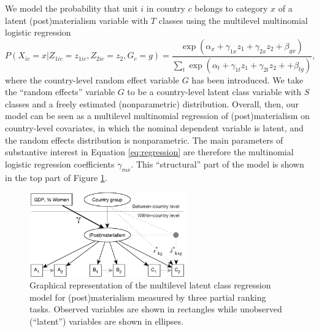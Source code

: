 \documentclass[letterpaper,12pt]{article}
\begin{document}
We  model the probability that unit $i$ in country $c$ belongs to category $x$ of a latent (post)materialism variable with $T$ classes using the multilevel multinomial logistic regression
\begin{equation}
P(X_{ic} = x| Z_{1ic} = z_{1ic}, Z_{2ic} = z_2, G_c = g) = \frac{\exp(\alpha_x + \gamma_{1x} z_1 +\gamma_{2x} z_2  + \beta_{gx})}
					{\sum_t \exp(\alpha_t + \gamma_{1t} z_1 +  \gamma_{2t} z_2 +  + \beta_{tg})},
					\label{eq:regression}
\end{equation}
where the country-level random effect variable $G$ has been introduced. We take the ``random effects'' variable $G$ to be a country-level latent class variable with $S$ classes and a freely estimated (nonparametric) distribution. Overall, then, our model can be seen as a multilevel multinomial regression of (post)materialism on country-level covariates, in which the nominal dependent variable is latent, and the random effects distribution is nonparametric. The main parameters of substantive interest in Equation \ref{eq:regression} are therefore the multinomial logistic regression coefficients $\gamma_{mx}$. This ``structural'' part of the model is shown in the top part of Figure \ref{fig:model}.


\begin{figure}\centering
	\includegraphics[width=0.6\textwidth]{model}
	\caption{\label{fig:model}Graphical representation of 
	the multilevel latent class regression model for 
	(post)materialism measured by three partial ranking tasks. Observed variables are shown in rectangles while unobserved (``latent'') variables are shown in ellipses.	}
\end{figure}
\end{document}
